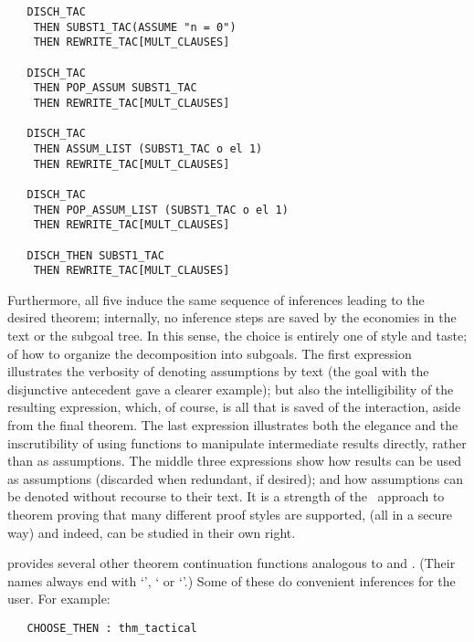 \begin{hol}
\begin{verbatim}
   DISCH_TAC
    THEN SUBST1_TAC(ASSUME "n = 0")
    THEN REWRITE_TAC[MULT_CLAUSES]

   DISCH_TAC
    THEN POP_ASSUM SUBST1_TAC
    THEN REWRITE_TAC[MULT_CLAUSES]

   DISCH_TAC
    THEN ASSUM_LIST (SUBST1_TAC o el 1)
    THEN REWRITE_TAC[MULT_CLAUSES]

   DISCH_TAC
    THEN POP_ASSUM_LIST (SUBST1_TAC o el 1)
    THEN REWRITE_TAC[MULT_CLAUSES]

   DISCH_THEN SUBST1_TAC
    THEN REWRITE_TAC[MULT_CLAUSES]
\end{verbatim}\end{hol}

\noindent Furthermore, all five induce the
same sequence of inferences leading to
the desired theorem; internally, no inference steps are saved by the
economies in the \ML{} text or the subgoal tree.  In this sense,
the choice is entirely one of style and taste;
of how to organize the decomposition into subgoals.
The first expression illustrates the verbosity of denoting
assumptions by text (the goal with the
disjunctive antecedent gave a clearer
example); but also
the intelligibility of the resulting expression, which, of course, is all
that is saved of the interaction, aside from the final theorem.
The last expression
illustrates both the elegance and the inscrutibility of
using functions to manipulate intermediate results directly, rather than
as assumptions.
The middle three expressions
show how results can be used as assumptions (discarded when
redundant, if desired); and how
assumptions can be denoted without
recourse to their text.
It is a strength of the \LCF\ approach
 to
theorem proving that many different proof styles are supported,
(all in a secure way) and indeed, can be studied in their own
right.

\HOL{} provides several other theorem continuation functions analogous to
 and .
(Their names always end with
`', ` or `'.)
Some of these do convenient inferences for the user.
For example:

\begin{boxed}\begin{verbatim}
   CHOOSE_THEN : thm_tactical
\end{verbatim}\end{boxed}

